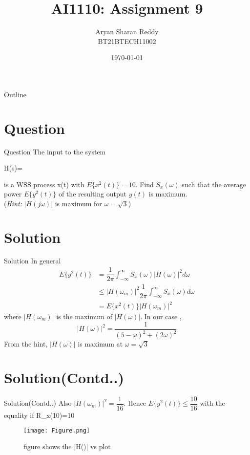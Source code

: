 \documentclass{beamer}
\title{AI1110: Assignment 9}
\author{Aryan Sharan Reddy\\BT21BTECH11002}
\date{\today}
\begin{document}
\begin{frame}
    \titlepage 
\end{frame}



\begin{frame}{Outline}
    \tableofcontents
\end{frame}


\section{Question}
\begin{frame}{Question}
The input to the system

\begin{center}
    H(s)=\\
\end{center}

is a WSS  process x(t) with $E\{x^2(t)\}=10$. Find $S_{x}(\omega)$ such that the average power $E\{y^{2}(t)\}$ of the resulting output $y(t)$ is maximum.
\\
(\textit{Hint:} $|H(j\omega)|$ is maximum for $\omega=\sqrt{3}$)
\end{frame}

\section{Solution}
\begin{frame}{Solution}
In general
\begin{align}
    E\{y^{2}(t)\} &= \dfrac{1}{2\pi} \int_{-\infty}^{\infty} S_{x}(\omega)|H(\omega)|^{2}d\omega\\
                &\leq |H(\omega_{m})|^{2} \dfrac{1}{2\pi}\int_{-\infty}^{\infty} S_{x}(\omega)d\omega\\
                &= E\{x^{2}(t)\} |H(\omega_{m})|^{2}
\end{align}
where $|H(\omega_{m})|$ is the maximum of $|H(\omega)|$. In our case ,
\begin{equation}
    |H(\omega)|^{2} = \dfrac{1}{(5-\omega)^2 + (2\omega)^2}
\end{equation}
From the hint, $|H(\omega)|$ is maximum at $\omega=\sqrt{3}$
\end{frame}

\section{Solution(Contd..)}
\begin{frame}{Solution(Contd..)}
Also $|H(\omega_{m})|^{2}=\dfrac{1}{16}$. Hence $E\{y^{2}(t)\} \leq \dfrac{10}{16}$ with the equality if R_{x}(10)=10\cos {}\tau 

\begin{figure}[!ht]
        \centering
        \texttt{[image: Figure.png]}
        \caption{figure shows the |H(\omega)| vs \omega plot }
        \label{fig-1}
        \end{figure}
\end{frame}
\end{document}
